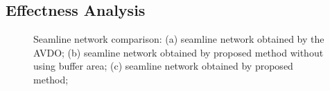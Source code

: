 \documentclass[journal]{IEEEtran}
\begin{document}
\subsection{Effectness Analysis}

\begin{figure}[!t]
	\centering
	\caption{Seamline network comparison: (a) seamline network obtained by the AVDO; (b) seamline network obtained by proposed method without using buffer area; (c) seamline network obtained by proposed method;  }
	\label{fig:mosaic-overall-performance}
\end{figure}
\end{document}
